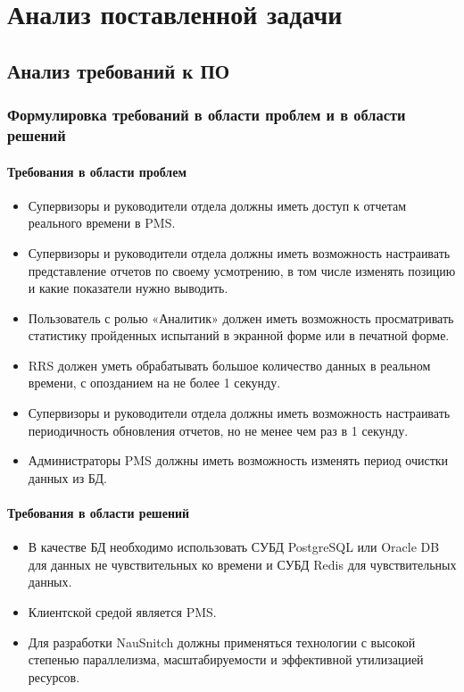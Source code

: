\chapter{Анализ поставленной задачи}
\label{ch:analysis}

\section{Анализ требований к ПО}

\subsection{Формулировка требований в области проблем и в области решений}

\subsubsection{Требования в области проблем}

\begin{itemize}
    \item Супервизоры и руководители отдела должны иметь доступ к отчетам реального времени в PMS\@.
    \item Супервизоры и руководители отдела должны иметь возможность настраивать представление отчетов по своему усмотрению, в том числе изменять позицию и какие показатели нужно выводить.
    \item Пользователь с ролью «Аналитик» должен иметь возможность просматривать статистику пройденных испытаний в экранной форме или в печатной форме.
    \item RRS должен уметь обрабатывать большое количество данных в реальном времени, с опозданием на не более 1 секунду.
    \item Супервизоры и руководители отдела должны иметь возможность настраивать периодичность обновления отчетов, но не менее чем раз в 1 секунду.
    \item Администраторы PMS должны иметь возможность изменять период очистки данных из БД.
\end{itemize}

\subsubsection{Требования в области решений}

\begin{itemize}
    \item В качестве БД необходимо использовать СУБД PostgreSQL или Oracle DB для данных не чувствительных ко времени и СУБД Redis для чувствительных данных.
    \item Клиентской средой является PMS\@.
    \item Для разработки NauSnitch должны применяться технологии с высокой степенью параллелизма, масштабируемости и эффективной утилизацией ресурсов.
\end{itemize}

